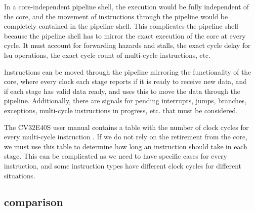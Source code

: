 In a core-independent pipeline shell, the execution would be fully independent of the core, and the movement of instructions through the pipeline would be completely contained in the pipeline shell. This complicates the pipeline shell because the pipeline shell has to mirror the exact execution of the core at every cycle. It must account for forwarding hazards and stalls, the exact cycle delay for \acrshort{lsu} operations, the exact cycle count of multi-cycle instructions, etc.

Instructions can be moved through the pipeline mirroring the functionality of the core, where every clock each stage reports if it is ready to receive new data, and if each stage has valid data ready, and uses this to move the data through the pipeline. Additionally, there are signals for pending interrupts, jumps, branches, exceptions, multi-cycle instructions in progress, etc. that must be considered. 

The CV32E40S user manual contains a table with the number of clock cycles for every multi-cycle instruction \cite{openhwgroupPipelineDetailsCOREV2023}. If we do not rely on the retirement from the core, we must use this table to determine how long an instruction should take in each stage. This can be complicated as we need to have specific cases for every instruction, and some instruction types have different clock cycles for different situations.


\subsection{comparison}

